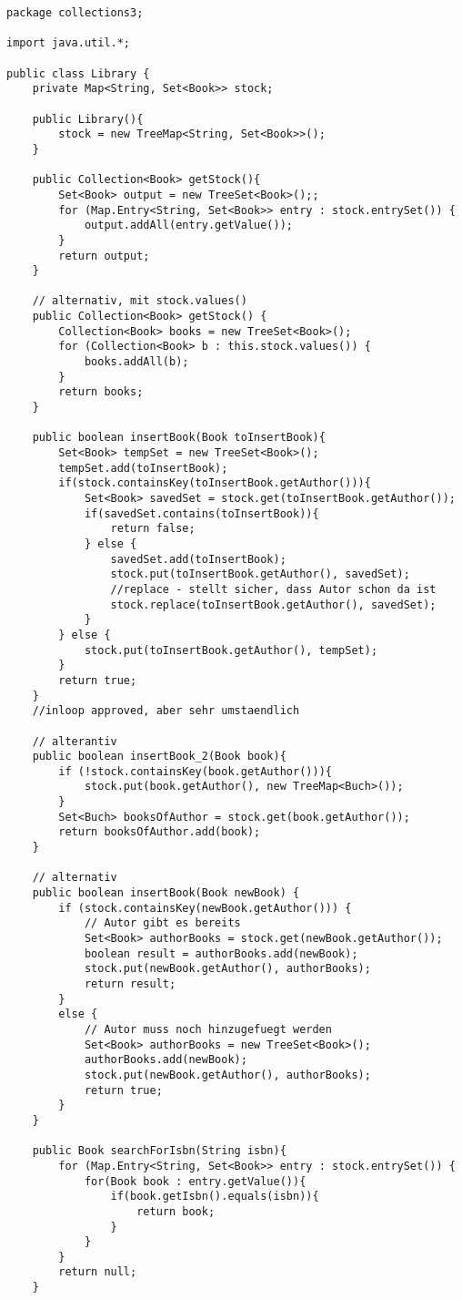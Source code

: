 \documentclass{article}
\begin{document}
	\begin{lstlisting}[style=java,tabsize=2]
package collections3;

import java.util.*;

public class Library {
	private Map<String, Set<Book>> stock;

	public Library(){
		stock = new TreeMap<String, Set<Book>>(); 
	}

	public Collection<Book> getStock(){
		Set<Book> output = new TreeSet<Book>();;
		for (Map.Entry<String, Set<Book>> entry : stock.entrySet()) {
			output.addAll(entry.getValue());
		}
		return output;
	}

	// alternativ, mit stock.values()
	public Collection<Book> getStock() {
		Collection<Book> books = new TreeSet<Book>();
		for (Collection<Book> b : this.stock.values()) {
			books.addAll(b);
		}
		return books;
	}

	public boolean insertBook(Book toInsertBook){
		Set<Book> tempSet = new TreeSet<Book>();
		tempSet.add(toInsertBook);
		if(stock.containsKey(toInsertBook.getAuthor())){
			Set<Book> savedSet = stock.get(toInsertBook.getAuthor());
			if(savedSet.contains(toInsertBook)){
				return false;
			} else {
				savedSet.add(toInsertBook);
				stock.put(toInsertBook.getAuthor(), savedSet);
				//replace - stellt sicher, dass Autor schon da ist
				stock.replace(toInsertBook.getAuthor(), savedSet);
			}
		} else {
			stock.put(toInsertBook.getAuthor(), tempSet);
		}
		return true;
	}
	//inloop approved, aber sehr umstaendlich

	// alterantiv
	public boolean insertBook_2(Book book){
		if (!stock.containsKey(book.getAuthor())){
			stock.put(book.getAuthor(), new TreeMap<Buch>());
		}
		Set<Buch> booksOfAuthor = stock.get(book.getAuthor());
		return booksOfAuthor.add(book);
	}

	// alternativ
	public boolean insertBook(Book newBook) {
		if (stock.containsKey(newBook.getAuthor())) {
			// Autor gibt es bereits
			Set<Book> authorBooks = stock.get(newBook.getAuthor());
			boolean result = authorBooks.add(newBook);
			stock.put(newBook.getAuthor(), authorBooks);
			return result;
		}
		else {
			// Autor muss noch hinzugefuegt werden
			Set<Book> authorBooks = new TreeSet<Book>();
			authorBooks.add(newBook);
			stock.put(newBook.getAuthor(), authorBooks);
			return true;
		}
	}

	public Book searchForIsbn(String isbn){
		for (Map.Entry<String, Set<Book>> entry : stock.entrySet()) {
			for(Book book : entry.getValue()){
				if(book.getIsbn().equals(isbn)){
					return book;
				}
			}
		}
		return null;
	}


\end{lstlisting}
\end{document}
